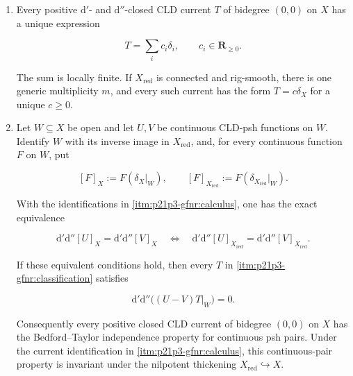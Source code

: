 \begin{proposition}
\begin{enumerate}
\begin{equation}
\label{eq:p21p3-gfnr-fundamental-cycle}
        \delta_X=\sum_i m_i\delta_i,
        \qquad
        \iota_*\delta_{X_{\mathrm{red}}}=\sum_i\delta_i.
\end{equation}

Both sums are locally finite.  In particular,
\(\delta_X=\iota_*\delta_{X_{\mathrm{red}}}\) if and only if \(X\) is
generically reduced along every \(X_i\).

\item\label{itm:p21p3-gfnr:classification}
Every positive \(\mathrm d'\)- and \(\mathrm d''\)-closed CLD current \(T\)
of bidegree \((0,0)\) on \(X\) has a unique expression

\begin{equation}
\label{eq:p21p3-gfnr-classification}
                     T=\sum_i c_i\delta_i,
                     \qquad c_i\in\mathbf R_{\geq0}.
\end{equation}

The sum is locally finite.  If \(X_{\mathrm{red}}\) is connected and
rig-smooth, there is one generic multiplicity \(m\), and every such current
has the form \(T=c\delta_X\) for a unique \(c\geq0\).

\item\label{itm:p21p3-gfnr:bedford-taylor}
Let \(W\subseteq X\) be open and let \(U,V\) be continuous CLD-psh
functions on \(W\).  Identify \(W\) with its inverse image in
\(X_{\mathrm{red}}\), and, for every continuous function \(F\) on \(W\),
put

\[
 [F]_X:=F(\delta_X|_W),\qquad
 [F]_{X_{\mathrm{red}}}:=F(\delta_{X_{\mathrm{red}}}|_W).
\]

With the identifications in \cref{itm:p21p3-gfnr:calculus}, one has the
exact equivalence

\begin{equation}
\label{eq:p21p3-gfnr-curvature-equivalence}
 \mathrm d'\mathrm d''[U]_X=\mathrm d'\mathrm d''[V]_X
 \quad\Longleftrightarrow\quad
 \mathrm d'\mathrm d''[U]_{X_{\mathrm{red}}}
   =\mathrm d'\mathrm d''[V]_{X_{\mathrm{red}}}.
\end{equation}

If these equivalent conditions hold, then every \(T\) in
\cref{itm:p21p3-gfnr:classification} satisfies

\begin{equation}
\label{eq:p21p3-gfnr-bt-conclusion}
       \mathrm d'\mathrm d''\bigl((U-V)T|_W\bigr)=0.
\end{equation}

Consequently every positive closed CLD current of bidegree \((0,0)\) on
\(X\) has the Bedford--Taylor independence property for continuous psh
pairs.  Under the current identification in
\cref{itm:p21p3-gfnr:calculus}, this continuous-pair property is invariant
under the nilpotent thickening
\(X_{\mathrm{red}}\hookrightarrow X\).
\end{enumerate}
\end{proposition}

